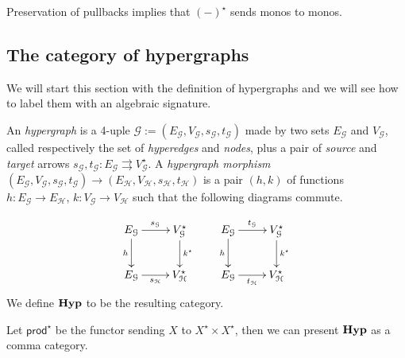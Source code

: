 \documentclass[runningheads,envcountsect]{lipics-v2021}
\newcommand{\Set}{\mathbf{Set}}
\def\X{\textbf {\textup{X}}}
\newcommand{\catname}[1]{\textbf{\textup{#1}}}
\newcommand{\hyp}{\catname{Hyp}}
\newcommand{\pro}{\mathsf{prod}}
\newcommand{\comma}[2]{#1\hspace{1pt} {\downarrow}#2}
\newcommand{\id}[1]{\mathsf{id}_{#1}}
\begin{document}
\begin{remark}\label{rem:mono}
	Preservation of pullbacks implies that $(-)^\star$ sends monos to monos.
\end{remark}


\subsection{The category of hypergraphs}

We will start this section with the definition of hypergraphs and we will see how to label them with an algebraic signature.  


\begin{definition}An \emph{hypergraph} is a 4-uple $\mathcal{G}:=(E_\mathcal{G}, V_\mathcal{G}, s_\mathcal{G}, t_\mathcal{G})$ made by two sets $E_\mathcal{G}$ and $V_\mathcal{G}$, called respectively the set of \emph{hyperedges} and \emph{nodes}, plus a pair of \emph{source} and \emph{target} arrows  $s_\mathcal{G}, t_\mathcal{G}\colon E_\mathcal{G}\rightrightarrows V_\mathcal{G}^\star$. A \emph{hypergraph morphism} $(E_\mathcal{G}, V_\mathcal{G}, s_\mathcal{G}, t_\mathcal{G})\to (E_\mathcal{H}, V_\mathcal{H}, s_\mathcal{H}, t_\mathcal{H})$ is a pair $(h,k)$ of functions $h\colon E_\mathcal{G}\to E_\mathcal{H}$, $k\colon V_\mathcal{G}\to V_\mathcal{H}$ such that the following diagrams commute.
	
	\[\xymatrix{ E_{\mathcal{G}} \ar[d]_{h} \ar[r]^{s_{\mathcal{G}}}& V^\star_{\mathcal{G}}  \ar[d]^{k^\star}& E_{\mathcal{G}} \ar[r]^{t_{\mathcal{G}}} \ar[d]_{h} & V^\star_{\mathcal{G}} \ar[d]^{k^\star}  \\ E_{\mathcal{G}} \ar[r]_{s_{\mathcal{H}}} & V^\star_{\mathcal{H}} & E_{\mathcal{G}} \ar[r]_{t_{\mathcal{H}}} & V^\star_{\mathcal{H}} }\]
	We define $\hyp$ to be the resulting category.
\end{definition}

Let $\pro^\star$ be the functor sending $X$ to $X^\star\times X^\star$, then we can present $\hyp$ as a comma category.
\end{document}
